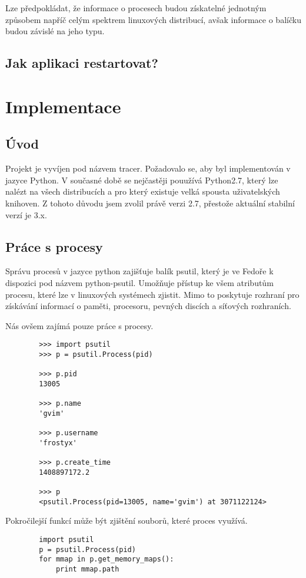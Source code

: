 \documentclass[10pt,a4paper]{article}
\begin{document}
		Lze předpokládat, že informace o procesech budou získatelné jednotným způsobem napříč celým spektrem linuxových distribucí, avšak informace o balíčku budou závislé na jeho typu.
		
		\subsection{Jak aplikaci restartovat?} 
	
	\section{Implementace}
		\subsection{Úvod}
		Projekt je vyvíjen pod názvem tracer. Požadovalo se, aby byl implementován v jazyce Python. V současné době se nejčastěji pouužívá Python2.7, který lze nalézt na všech distribucích a pro který existuje velká spousta uživatelských knihoven. Z tohoto důvodu jsem zvolil právě verzi 2.7, přestože aktuální stabilní verzí je 3.x.		
		
		\subsection{Práce s procesy}
		Správu procesů v jazyce python zajišťuje balík psutil, který je ve Fedoře k dispozici pod názvem python-psutil. Umožňuje přístup ke všem atributům procesu, které lze v linuxových systémech zjistit. Mimo to poskytuje rozhraní pro získávání informací o paměti, procesoru, pevných discích a síťových rozhraních.		

		Nás ovšem zajímá pouze práce s procesy.

		\begin{verbatim}
		>>> import psutil
		>>> p = psutil.Process(pid)

		>>> p.pid
		13005

		>>> p.name
		'gvim'

		>>> p.username
		'frostyx'

		>>> p.create_time
		1408897172.2

		>>> p
		<psutil.Process(pid=13005, name='gvim') at 3071122124>

		\end{verbatim}
		
		Pokročilejší funkcí může být zjištění souborů, které proces využívá.
		
		\begin{verbatim}
		import psutil
		p = psutil.Process(pid)
		for mmap in p.get_memory_maps():
		    print mmap.path
		\end{verbatim}
				
\end{document}

